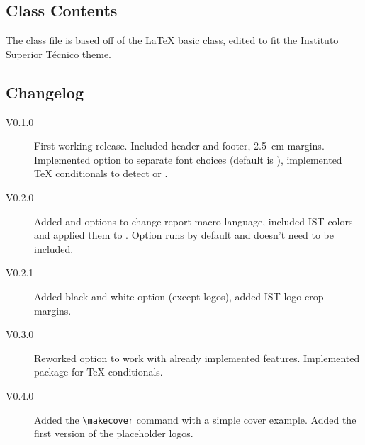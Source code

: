 \subsection{Class Contents}

The class file is based off of the \LaTeX{} basic  class, edited to fit the Instituto Superior Técnico theme.

\subsection{Changelog}

\begin{description}
	\item[V0.1.0] First working release. Included header and footer, \SI{2.5}{\centi\meter} margins. Implemented  option to separate font choices (default is ), implemented \TeX{} conditionals to detect  or .
	\item[V0.2.0] Added  and  options to change report macro language, included IST colors and applied them to . Option  runs by default and doesn't need to be included.
	\item[V0.2.1] Added black and white option (except logos), added IST logo crop margins.
	\item[V0.3.0] Reworked  option to work with already implemented features. Implemented  package for \TeX{} conditionals.
	\item[V0.4.0] Added the \verb|\makecover| command with a simple cover example. Added the first version of the placeholder logos.
\end{description}
